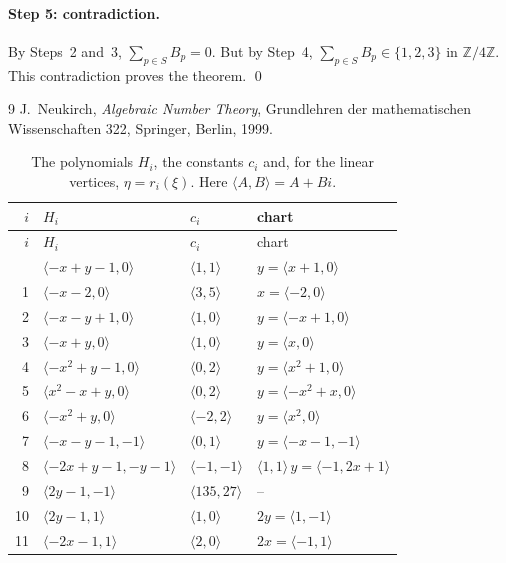 \documentclass[11pt]{article}
\newcommand{\Z}{\mathbb{Z}}
\begin{document}
\paragraph{Step 5: contradiction.} By Steps~2 and~3, $\sum_{p\in S}B_p=0$. But by Step~4, $\sum_{p\in S}B_p\in\{1,2,3\}$ in $\Z/4\Z$. This contradiction proves the theorem.
\qed


\begin{thebibliography}{9}
 J.~Neukirch, \emph{Algebraic Number Theory}, Grundlehren der mathematischen Wissenschaften 322, Springer, Berlin, 1999.
\end{thebibliography}

\clearpage
\begingroup\small
\setlength{\LTcapwidth}{\textwidth}
\begin{longtable}{@{}rlll@{}}
\caption{The polynomials $H_i$, the constants $c_i$ and, for the linear vertices, $\eta=r_i(\xi)$. Here $\langle A,B\rangle=A+Bi$.}\label{tab:vert1}\\
\hline $i$ & $H_i$ & $c_i$ & chart\\\hline\endfirsthead\hline $i$ & $H_i$ & $c_i$ & chart\\\hline\endhead\hline\endfoot
0 & $\langle -x+y-1,0\rangle$ & $\langle 1,1\rangle$ & $y=\langle x+1,0\rangle$\\
1 & $\langle -x-2,0\rangle$ & $\langle 3,5\rangle$ & $x=\langle -2,0\rangle$\\
2 & $\langle -x-y+1,0\rangle$ & $\langle 1,0\rangle$ & $y=\langle -x+1,0\rangle$\\
3 & $\langle -x+y,0\rangle$ & $\langle 1,0\rangle$ & $y=\langle x,0\rangle$\\
4 & $\langle -x^{2}+y-1,0\rangle$ & $\langle 0,2\rangle$ & $y=\langle x^{2}+1,0\rangle$\\
5 & $\langle x^{2}-x+y,0\rangle$ & $\langle 0,2\rangle$ & $y=\langle -x^{2}+x,0\rangle$\\
6 & $\langle -x^{2}+y,0\rangle$ & $\langle -2,2\rangle$ & $y=\langle x^{2},0\rangle$\\
7 & $\langle -x-y-1,-1\rangle$ & $\langle 0,1\rangle$ & $y=\langle -x-1,-1\rangle$\\
8 & $\langle -2x+y-1,-y-1\rangle$ & $\langle -1,-1\rangle$ & $\langle 1,1\rangle\,y=\langle -1,2x+1\rangle$\\
9 & $\langle 2y-1,-1\rangle$ & $\langle 135,27\rangle$ & --\\
10 & $\langle 2y-1,1\rangle$ & $\langle 1,0\rangle$ & $2y=\langle 1,-1\rangle$\\
11 & $\langle -2x-1,1\rangle$ & $\langle 2,0\rangle$ & $2x=\langle -1,1\rangle$\\

\end{longtable}
\end{document}
